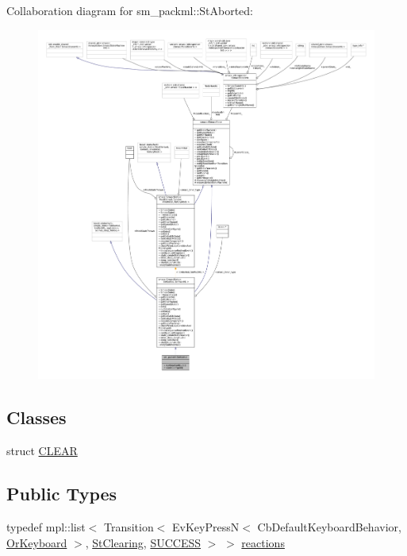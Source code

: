 Collaboration diagram for sm\+\_\+packml\+:\+:St\+Aborted\+:
\nopagebreak
\begin{figure}[H]
\begin{center}
\leavevmode
\includegraphics[width=350pt]{structsm__packml_1_1StAborted__coll__graph}
\end{center}
\end{figure}
\subsection*{Classes}
\begin{DoxyCompactItemize}
\item 
struct \hyperlink{structsm__packml_1_1StAborted_1_1CLEAR}{C\+L\+E\+AR}
\end{DoxyCompactItemize}
\subsection*{Public Types}
\begin{DoxyCompactItemize}
\item 
typedef mpl\+::list$<$ Transition$<$ Ev\+Key\+PressN$<$ Cb\+Default\+Keyboard\+Behavior, \hyperlink{classsm__packml_1_1OrKeyboard}{Or\+Keyboard} $>$, \hyperlink{structsm__packml_1_1StClearing}{St\+Clearing}, \hyperlink{classSUCCESS}{S\+U\+C\+C\+E\+SS} $>$ $>$ \hyperlink{structsm__packml_1_1StAborted_a0ada6056ec0c5c45cd03c1c4bf720501}{reactions}
\end{DoxyCompactItemize}
